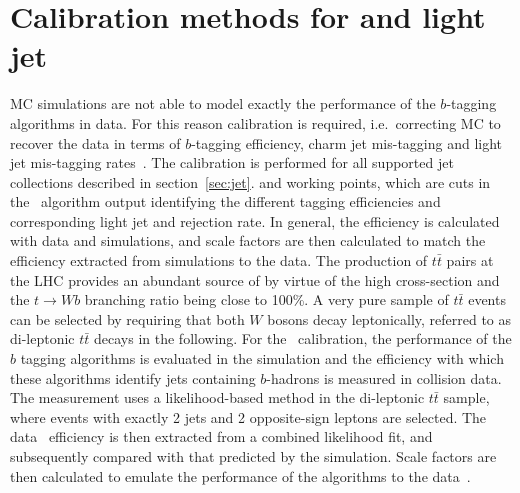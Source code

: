 \label{sec:FTAG}
\section{Calibration methods for \texorpdfstring{\bjet}{b-jet} and light jet}
\large
MC simulations are not able to model exactly the 
performance of the $b$-tagging algorithms in data. For this reason 
calibration is required, i.e.\ correcting MC to recover the data 
in terms of $b$-tagging efficiency, charm jet mis-tagging and 
light jet mis-tagging rates~\cite{FTAG-2018-01}. The calibration is performed 
for all supported jet collections described in section~\ref{sec:jet}.
and working points, which are cuts in the \btagging\ 
algorithm output identifying the different tagging efficiencies 
and corresponding light jet and \cjet rejection rate.
In general, the efficiency is calculated with data and simulations, 
and scale factors are then calculated to match the efficiency extracted 
from simulations to the data.
The production of $t\bar{t}$ 
pairs at the LHC provides an abundant source of \bjets by virtue 
of the high cross-section and the $t \rightarrow Wb$ branching ratio 
being close to 100\%. A very pure sample of $t\bar{t}$ events can be 
selected by requiring that both $W$ bosons decay leptonically, 
referred to as di-leptonic $t\bar{t}$ decays in the following.
For the \bjet\ calibration, the performance of the $b$ tagging 
algorithms is evaluated in the simulation and the efficiency 
with which these algorithms identify jets containing $b$-hadrons 
is measured in collision data. The measurement uses a likelihood-based 
method in the di-leptonic $t\bar{t}$ sample, where
events with exactly 2 jets and 2 opposite-sign leptons are selected.  
The data \bjet\ efficiency is 
then extracted from a combined likelihood fit, and subsequently 
compared with that predicted by the simulation. Scale factors are 
then calculated to emulate the performance of the algorithms to the data~\cite{FTAG-2018-01}.

